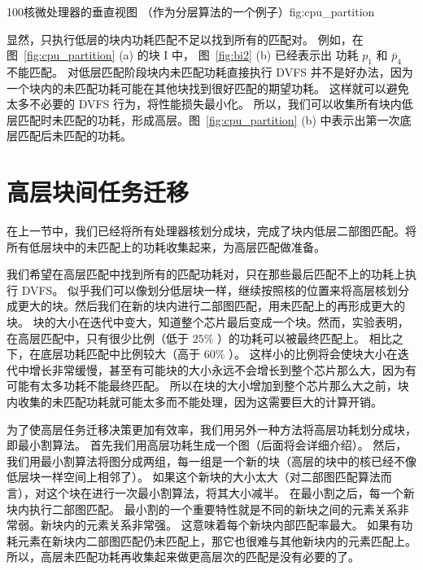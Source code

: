 \begin{pics}[h]{100核微处理器的垂直视图 （作为分层算法的一个例子）}{fig:cpu_partition}
  \centering

\end{pics}

显然，只执行低层的块内功耗匹配不足以找到所有的匹配对。
例如，在图~\ref{fig:cpu_partition} (a) 的块 I 中， 图~\ref{fig:bi2} (b) 已经表示出
功耗 $p_1$ 和 $\bar{p}_4$ 不能匹配。
对低层匹配阶段块内未匹配功耗直接执行 DVFS 并不是好办法，因为一个块内的未匹配功耗可能在其他块找到很好匹配的期望功耗。
这样就可以避免太多不必要的 DVFS 行为，将性能损失最小化。
所以，我们可以收集所有块内低层匹配时未匹配的功耗，形成高层。图~\ref{fig:cpu_partition} (b) 中表示出第一次底层匹配后未匹配的功耗。

\section{高层块间任务迁移}\label{sec:fm}

在上一节中，我们已经将所有处理器核划分成块，完成了块内低层二部图匹配。将所有低层块中的未匹配上的功耗收集起来，为高层匹配做准备。

我们希望在高层匹配中找到所有的匹配功耗对，只在那些最后匹配不上的功耗上执行 DVFS。
似乎我们可以像划分低层块一样，继续按照核的位置来将高层核划分成更大的块。然后我们在新的块内进行二部图匹配，用未匹配上的再形成更大的块。
块的大小在迭代中变大，知道整个芯片最后变成一个块。然而，实验表明，在高层匹配中，只有很少比例（低于 $25\%$ ）的功耗可以被最终匹配上。
相比之下，在底层功耗匹配中比例较大（高于 $60\%$ ）。
这样小的比例将会使块大小在迭代中增长非常缓慢，甚至有可能块的大小永远不会增长到整个芯片那么大，因为有可能有太多功耗不能最终匹配。
所以在块的大小增加到整个芯片那么大之前，块内收集的未匹配功耗就可能太多而不能处理，因为这需要巨大的计算开销。

为了使高层任务迁移决策更加有效率，我们用另外一种方法将高层功耗划分成块，即最小割算法。
首先我们用高层功耗生成一个图（后面将会详细介绍）。
然后，我们用最小割算法将图分成两组，每一组是一个新的块（高层的块中的核已经不像低层块一样空间上相邻了）。
如果这个新块的大小太大（对二部图匹配算法而言），对这个块在进行一次最小割算法，将其大小减半。
在最小割之后，每一个新块内执行二部图匹配。
最小割的一个重要特性就是不同的新块之间的元素关系非常弱。新块内的元素关系非常强。
这意味着每个新块内部匹配率最大。
如果有功耗元素在新块内二部图匹配仍未匹配上，那它也很难与其他新块内的元素匹配上。
所以，高层未匹配功耗再收集起来做更高层次的匹配是没有必要的了。

